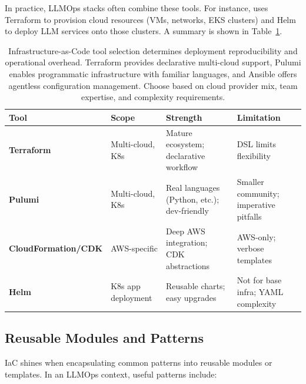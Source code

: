 In practice, LLMOps stacks often combine these tools. For instance, \ishtar{} uses Terraform to provision cloud resources (VMs, networks, EKS clusters) and Helm to deploy LLM services onto those clusters. A summary is shown in Table~\ref{tab:ch03_iaccompare}.

\begin{table}[t]
  \centering
  \small
  \caption{Infrastructure-as-Code tool selection determines deployment reproducibility and operational overhead. Terraform provides declarative multi-cloud support, Pulumi enables programmatic infrastructure with familiar languages, and Ansible offers agentless configuration management. Choose based on cloud provider mix, team expertise, and complexity requirements.}
  \label{tab:ch03_iaccompare}
  \setlength{\tabcolsep}{6pt}
  \renewcommand{\arraystretch}{1.3}
  \begin{tabularx}{\linewidth}{@{}l>{\raggedright\arraybackslash}p{2.8cm}>{\raggedright\arraybackslash}X>{\raggedright\arraybackslash}X@{}}
    \toprule
    \rowcolor{gray!15}
    \textbf{Tool} & \textbf{Scope} & \textbf{Strength} & \textbf{Limitation} \\
    \midrule
    \textbf{Terraform} & Multi-cloud, K8s & Mature ecosystem; declarative workflow & DSL limits flexibility \\
    \addlinespace
    \textbf{Pulumi} & Multi-cloud, K8s & Real languages (Python, etc.); dev-friendly & Smaller community; imperative pitfalls \\
    \addlinespace
    \textbf{CloudFormation/CDK} & AWS-specific & Deep AWS integration; CDK abstractions & AWS-only; verbose templates \\
    \addlinespace
    \textbf{Helm} & K8s app deployment & Reusable charts; easy upgrades & Not for base infra; YAML complexity \\
    \bottomrule
  \end{tabularx}
\end{table}

\subsection{Reusable Modules and Patterns}
\label{sec:iac-modules}

IaC shines when encapsulating common patterns into reusable modules or templates. In an LLMOps context, useful patterns include:

